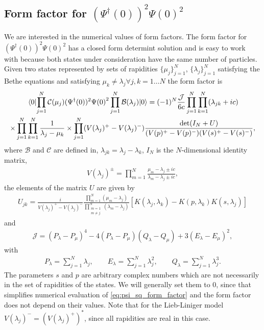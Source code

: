 \documentclass[11pt, a4paper]{report} %
\begin{document}
\subsection{Form factor for ${(\Psi^{\dag}(0))}^2{\Psi(0)}^2$}
We are interested in the numerical values of form factors.
The form factor for $(\Psi^{\dag}(0))^2\Psi(0)^2$ has a closed form determint solution and is easy to work with because both states under consideration have the same number of particles.
Given two states represented by sets of rapidities \(\{\mu_j\}^N_{j=1}\), \(\{\lambda_j\}^N_{j=1}\) satisfying the Bethe equations and satisfying \(\mu_k\neq \lambda_j \forall j,k=1\ldots N\) the form factor is \cite{Piroli2015}
\begin{multline}\label{eq:psi_sq_form_factor}
  \matrixel{0}{\prod_{j=1}^{N}\mathcal{C}(\mu_j) (\Psi^{\dag}(0))^2{\Psi(0)}^2 \prod_{j=1}^N\mathcal{B}(\lambda_j)}{0} =
  (-1)^N \frac{\mathcal{J}}{6c} \prod_{j=1}^{N}\prod_{k=1}^N (\lambda_{jk}+ic)\\ \times \prod_{j=1}^{N}\prod_{k=1}^N \frac{1}{\lambda_j - \mu_k}
  \times \prod_{j=1}^N(V(\lambda_j)^+ - V(\lambda_j)^-) \frac{\det(I_N + U)}{(V(p)^+ - V(p)^-)(V(s)^+ - V(s)^-)},
\end{multline}
where \(\mathcal{B}\) and \(\mathcal{C}\) are defined in, \(\lambda_{jk} = \lambda_j-\lambda_k\), \(I_N\) is the \(N\)-dimensional identity matrix,
\begin{align}
  V(\lambda_j)^{\pm} = \prod_{m=1}^N \frac{\mu_m - \lambda_j \pm ic}{\lambda_m -\lambda_j \pm ic},
\end{align}
the elements of the matrix \(U\) are given by
\begin{align}
  U_{jk} = \frac{i}{V(\lambda_j)^+ - V(\lambda_j)^-} \frac{\prod_{m=1}^N (\mu_m - \lambda_j)}{\prod_{\substack{m=1\\m\neq j}}^N (\lambda_m-\lambda_j)} \left[K(\lambda_j,\lambda_k) - K(p,\lambda_k)K(s,\lambda_j)\right]
\end{align}
and
\begin{align}
  \mathcal{J} = (P_{\lambda} - P_{\mu})^4 - 4 (P_{\lambda} - P_{\mu})(Q_{\lambda}-Q_{\mu}) + 3 (E_{\lambda} - E_{\mu})^2,
\end{align}
with
\begin{align}
  P_{\lambda} = \sum_{j=1}^N \lambda_j, \qquad E_{\lambda} = \sum_{j=1}^N \lambda_j^2, \qquad Q_{\lambda} = \sum_{j=1}^N \lambda_j^3.
\end{align}
The parameters \(s\) and \(p\) are arbitrary complex numbers which are not necessarily in the set of rapidities of the states.
We will generally set them to 0, since that simplifies numerical evaluation of \cref{eq:psi_sq_form_factor} and the form factor does not depend on their values.
Note that for the Lieb-Liniger model \(V(\lambda_j)^{-} = (V(\lambda_j)^{+})^{*}\), since all rapidities are real in this case.
\end{document}
